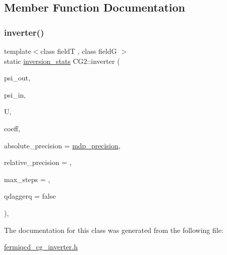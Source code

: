 \subsection{Member Function Documentation}
\mbox{\label{class_c_g2_afa577ee7a31d10e8f1d6e58f07e70598}} 
\subsubsection{\texorpdfstring{inverter()}{inverter()}}
{\footnotesize\ttfamily template$<$class fieldT , class fieldG $>$ \\
static \hyperlink{classinversion__stats}{inversion\+\_\+stats} C\+G2\+::inverter (\begin{DoxyParamCaption}\item[{fieldT \&}]{psi\+\_\+out,  }\item[{fieldT \&}]{psi\+\_\+in,  }\item[{fieldG \&}]{U,  }\item[{\hyperlink{classcoefficients}{coefficients} \&}]{coeff,  }\item[{\hyperlink{mdp__global__vars_8h_a69d96b74c791e0bbdb888b3913a69450}{mdp\+\_\+real}}]{absolute\+\_\+precision = {\ttfamily \hyperlink{mdp__global__vars_8h_a443a4ca745298420893e113a7ac926a9}{mdp\+\_\+precision}},  }\item[{\hyperlink{mdp__global__vars_8h_a69d96b74c791e0bbdb888b3913a69450}{mdp\+\_\+real}}]{relative\+\_\+precision = {},  }\item[{int}]{max\+\_\+steps = {},  }\item[{bool}]{qdaggerq = {\ttfamily false} }\end{DoxyParamCaption})\hspace{0.3cm}{\ttfamily [inline]}, {\ttfamily [static]}}



The documentation for this class was generated from the following file\+:\begin{DoxyCompactItemize}
\item 
\hyperlink{fermiqcd__cg__inverter_8h}{fermiqcd\+\_\+cg\+\_\+inverter.\+h}\end{DoxyCompactItemize}

